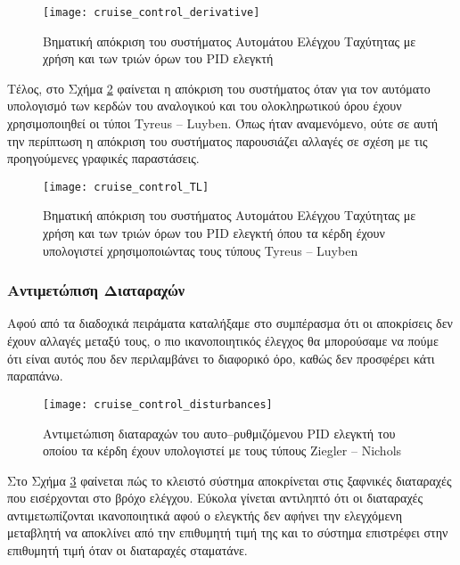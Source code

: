 \begin{figure}[h]
  \centering
  \texttt{[image: cruise\_control\_derivative]}
  \caption{Βηματική απόκριση του συστήματος Αυτομάτου Ελέγχου Ταχύτητας με χρήση και των τριών όρων του PID ελεγκτή}
  \label{fig:cruise_control_derivative}
\end{figure}

Τέλος, στο Σχήμα \ref{fig:cruise_control_TL} φαίνεται η απόκριση του συστήματος όταν για τον αυτόματο υπολογισμό των κερδών του αναλογικού και του ολοκληρωτικού όρου έχουν χρησιμοποιηθεί οι τύποι Tyreus -- Luyben. Όπως ήταν αναμενόμενο, ούτε σε αυτή την περίπτωση η απόκριση του συστήματος παρουσιάζει αλλαγές σε σχέση με τις προηγούμενες γραφικές παραστάσεις.

\begin{figure}[h]
  \centering
  \texttt{[image: cruise\_control\_TL]}
  \caption{Βηματική απόκριση του συστήματος Αυτομάτου Ελέγχου Ταχύτητας με χρήση και των τριών όρων του PID ελεγκτή όπου τα κέρδη έχουν υπολογιστεί χρησιμοποιώντας τους τύπους Tyreus -- Luyben}
  \label{fig:cruise_control_TL}
\end{figure}

\subsubsection{Αντιμετώπιση Διαταραχών}

Αφού από τα διαδοχικά πειράματα καταλήξαμε στο συμπέρασμα ότι οι αποκρίσεις δεν έχουν αλλαγές μεταξύ τους, ο πιο ικανοποιητικός έλεγχος θα μπορούσαμε να πούμε ότι είναι αυτός που δεν περιλαμβάνει το διαφορικό όρο, καθώς δεν προσφέρει κάτι παραπάνω. 

\begin{figure}[h]
  \centering
  \texttt{[image: cruise\_control\_disturbances]}
  \caption{Αντιμετώπιση διαταραχών του αυτο--ρυθμιζόμενου PID ελεγκτή του οποίου τα κέρδη έχουν υπολογιστεί με τους τύπους Ziegler -- Nichols}
  \label{fig:cruise_control_disturbances}
\end{figure}

\noindent
Στο Σχήμα \ref{fig:cruise_control_disturbances} φαίνεται πώς το κλειστό σύστημα αποκρίνεται στις ξαφνικές διαταραχές που εισέρχονται στο βρόχο ελέγχου. Εύκολα γίνεται αντιληπτό ότι οι διαταραχές αντιμετωπίζονται ικανοποιητικά αφού ο ελεγκτής δεν αφήνει την ελεγχόμενη μεταβλητή να αποκλίνει από την επιθυμητή τιμή της και το σύστημα επιστρέφει στην επιθυμητή τιμή όταν οι διαταραχές σταματάνε. 

